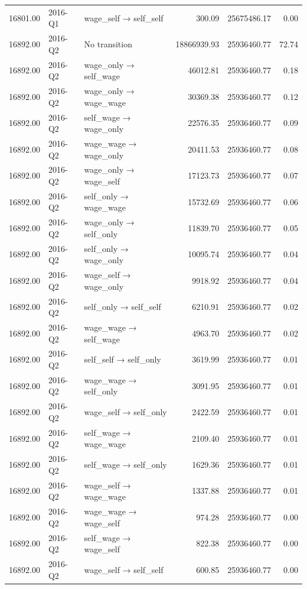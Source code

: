 \begin{table}[ht]
{\begin{tabular}{rllrrr}
  16801.00 & 2016-Q1 & wage\_self → self\_self & 300.09 & 25675486.17 & 0.00 \\ 
  16892.00 & 2016-Q2 & No transition & 18866939.93 & 25936460.77 & 72.74 \\ 
  16892.00 & 2016-Q2 & wage\_only → self\_wage & 46012.81 & 25936460.77 & 0.18 \\ 
  16892.00 & 2016-Q2 & wage\_only → wage\_wage & 30369.38 & 25936460.77 & 0.12 \\ 
  16892.00 & 2016-Q2 & self\_wage → wage\_only & 22576.35 & 25936460.77 & 0.09 \\ 
  16892.00 & 2016-Q2 & wage\_wage → wage\_only & 20411.53 & 25936460.77 & 0.08 \\ 
  16892.00 & 2016-Q2 & wage\_only → wage\_self & 17123.73 & 25936460.77 & 0.07 \\ 
  16892.00 & 2016-Q2 & self\_only → wage\_wage & 15732.69 & 25936460.77 & 0.06 \\ 
  16892.00 & 2016-Q2 & wage\_only → self\_only & 11839.70 & 25936460.77 & 0.05 \\ 
  16892.00 & 2016-Q2 & self\_only → wage\_only & 10095.74 & 25936460.77 & 0.04 \\ 
  16892.00 & 2016-Q2 & wage\_self → wage\_only & 9918.92 & 25936460.77 & 0.04 \\ 
  16892.00 & 2016-Q2 & self\_only → self\_self & 6210.91 & 25936460.77 & 0.02 \\ 
  16892.00 & 2016-Q2 & wage\_wage → self\_wage & 4963.70 & 25936460.77 & 0.02 \\ 
  16892.00 & 2016-Q2 & self\_self → self\_only & 3619.99 & 25936460.77 & 0.01 \\ 
  16892.00 & 2016-Q2 & wage\_wage → self\_only & 3091.95 & 25936460.77 & 0.01 \\ 
  16892.00 & 2016-Q2 & wage\_self → self\_only & 2422.59 & 25936460.77 & 0.01 \\ 
  16892.00 & 2016-Q2 & self\_wage → wage\_wage & 2109.40 & 25936460.77 & 0.01 \\ 
  16892.00 & 2016-Q2 & self\_wage → self\_only & 1629.36 & 25936460.77 & 0.01 \\ 
  16892.00 & 2016-Q2 & wage\_self → wage\_wage & 1337.88 & 25936460.77 & 0.01 \\ 
  16892.00 & 2016-Q2 & wage\_wage → wage\_self & 974.28 & 25936460.77 & 0.00 \\ 
  16892.00 & 2016-Q2 & self\_wage → wage\_self & 822.38 & 25936460.77 & 0.00 \\ 
  16892.00 & 2016-Q2 & wage\_self → self\_self & 600.85 & 25936460.77 & 0.00 \\ 

\end{tabular}}
\end{table}
